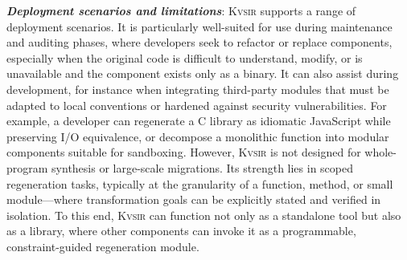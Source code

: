 \documentclass[sigplan,review,anonymous,10pt]{acmart}
\newcommand{\sys}{{\scshape Kv{\textalpha}sir}\xspace}
\newcommand{\heading}[1]{\vspace{2pt}\noindent\textbf{\emph{#1}}:\enspace}
\begin{document}
\heading{Deployment scenarios and limitations}
\sys supports a range of deployment scenarios.
It is particularly well-suited for use during maintenance and auditing phases, where developers seek to refactor or replace components, especially when the original code is difficult to understand, modify, or is unavailable and the component exists only as a binary.
It can also assist during development, for instance when integrating
third-party modules that must be adapted to local conventions or hardened
against security vulnerabilities.
For example, a developer can regenerate a C library as idiomatic
JavaScript while preserving I/O equivalence, or decompose a monolithic function
into modular components suitable for sandboxing.
However, \sys is not designed for whole-program synthesis or large-scale migrations.
Its strength lies in scoped regeneration tasks, typically at the granularity of a function, method, or small module---where transformation goals can be explicitly stated and verified in isolation.
To this end, \sys can function not only as a standalone tool but also as a
library, where other components can invoke it as a programmable,
constraint-guided regeneration module.


\end{document}
